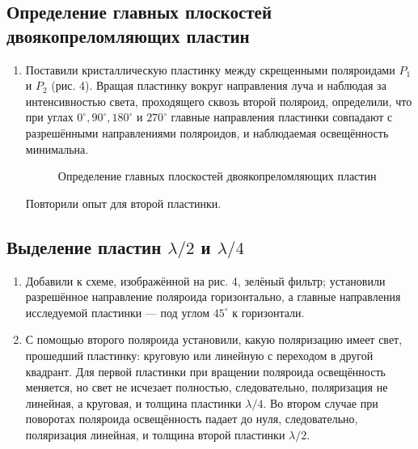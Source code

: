 \documentclass[a4paper,12pt]{article}
\begin{document}
	\subsection*{Определение главных плоскостей двоякопреломляющих пластин}
	\begin{enumerate}
		\item Поставили кристаллическую пластинку между скрещенными поляроидами $P_1$ и $P_2$ (рис. 4). Вращая пластинку вокруг направления луча и наблюдая за интенсивностью света, проходящего сквозь второй поляроид, определили, что при углах $0^\circ, 90^\circ, 180^\circ$ и $270^\circ$ главные направления пластинки совпадают с разрешёнными направлениями поляроидов, и наблюдаемая освещённость минимальна.
		\begin{figure}
		\centering
		    \caption{Определение главных плоскостей двоякопреломляющих пластин}
		\end{figure}
		
		Повторили опыт для второй пластинки.
		
	\end{enumerate}
	\subsection*{Выделение пластин $\lambda/2$ и $\lambda/4$}
	\begin{enumerate}
	    \item Добавили к схеме, изображённой на рис. 4, зелёный фильтр; установили разрешённое направление поляроида горизонтально, а главные направления исследуемой пластинки --- под углом $45^\circ$ к горизонтали.
	
	\item С помощью второго поляроида установили, какую поляризацию имеет свет, прошедший пластинку: круговую или линейную с переходом в другой квадрант. Для первой пластинки при вращении поляроида освещённость меняется, но свет не исчезает полностью, следовательно, поляризация не линейная, а круговая, и толщина пластинки $\lambda /4$. Во втором случае при поворотах поляроида освещённость падает до нуля, следовательно, поляризация линейная, и толщина второй пластинки $\lambda /2$.
	\end{enumerate}
\end{document}
